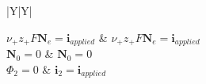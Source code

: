 \documentclass[12pt]{article}
\newcommand{\flux}{\mathrm{\mathbf{N}}}
\newcommand{\solcur}{\mathrm{\mathbf{i}}}
\begin{document}
\begin{table}[h]
\begin{tabularx}{\textwidth}{|Y|Y|}
				\hline
				 \\
				\hline

				\(\displaystyle \nu_+ z_+ F \flux_e = \solcur_{applied} \) 	&  \(\displaystyle \nu_+ z_+ F \flux_e = \solcur_{applied} \) \\
				\(\displaystyle \flux_0 = 0 \) 								&  \(\displaystyle \flux_0 = 0 \) \\
				\(\displaystyle \Phi_2 = 0 \)  								&  \(\displaystyle \solcur_2 = \solcur_{applied} \) \\

				\hline

			\end{tabularx}
		\end{table}



	\clearpage
\end{document}
